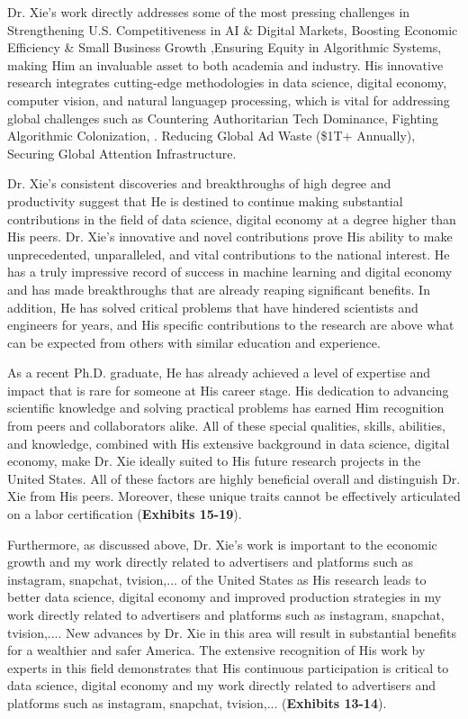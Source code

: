 \documentclass{article}
\begin{document}
Dr. Xie's work directly addresses some of the most pressing challenges in Strengthening U.S. Competitiveness in AI \& Digital Markets, Boosting Economic Efficiency \& Small Business Growth ,Ensuring Equity in Algorithmic Systems, making Him an invaluable asset to both academia and industry. His innovative research integrates cutting-edge methodologies in data science, digital economy, computer vision, and natural languagep processing, which is vital for addressing global challenges such as Countering Authoritarian Tech Dominance, Fighting Algorithmic Colonization, . Reducing Global Ad Waste (\$1T+ Annually), Securing Global Attention Infrastructure.

Dr. Xie's consistent discoveries and breakthroughs of high degree and productivity suggest that He is destined to continue making substantial contributions in the field of data science, digital economy at a degree higher than His peers. Dr. Xie's innovative and novel contributions prove His ability to make unprecedented, unparalleled, and vital contributions to the national interest. He has a truly impressive record of success in machine learning and digital economy and has made breakthroughs that are already reaping significant benefits. In addition, He has solved critical problems that have hindered scientists and engineers for years, and His specific contributions to the research are above what can be expected from others with similar education and experience.

As a recent Ph.D. graduate, He has already achieved a level of expertise and impact that is rare for someone at His career stage. His dedication to advancing scientific knowledge and solving practical problems has earned Him recognition from peers and collaborators alike. All of these special qualities, skills, abilities, and knowledge, combined with His extensive background in data science, digital economy, make Dr. Xie ideally suited to His future research projects in the United States. All of these factors are highly beneficial overall and distinguish Dr. Xie from His peers. Moreover, these unique traits cannot be effectively articulated on a labor certification (\textbf{Exhibits 15-19}).

Furthermore, as discussed above, Dr. Xie's work is important to the economic growth and my work directly related to advertisers and platforms such as instagram, snapchat, tvision,... of the United States as His research leads to better data science, digital economy and improved production strategies in my work directly related to advertisers and platforms such as instagram, snapchat, tvision,.... New advances by Dr. Xie in this area will result in substantial benefits for a wealthier and safer America. The extensive recognition of His work by experts in this field demonstrates that His continuous participation is critical to data science, digital economy and my work directly related to advertisers and platforms such as instagram, snapchat, tvision,... (\textbf{Exhibits 13-14}).
\end{document}
